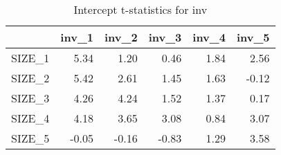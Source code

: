 \begin{table}[ht]
\centering
\caption{Intercept t-statistics for inv} 
\begin{tabular}{rrrrrr}
  \hline
 & inv\_1 & inv\_2 & inv\_3 & inv\_4 & inv\_5 \\ 
  \hline
SIZE\_1 & 5.34 & 1.20 & 0.46 & 1.84 & 2.56 \\ 
  SIZE\_2 & 5.42 & 2.61 & 1.45 & 1.63 & -0.12 \\ 
  SIZE\_3 & 4.26 & 4.24 & 1.52 & 1.37 & 0.17 \\ 
  SIZE\_4 & 4.18 & 3.65 & 3.08 & 0.84 & 3.07 \\ 
  SIZE\_5 & -0.05 & -0.16 & -0.83 & 1.29 & 3.58 \\ 
   \hline
\end{tabular}
\end{table}


